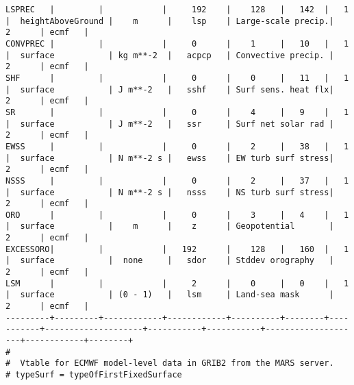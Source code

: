 \documentclass{egu}                  %
\begin{document}
\begin{landscape}
\begin{scriptsize}
\begin{verbatim}
LSPREC   |         |            |     192    |    128   |   142  |   1       |  heightAboveGround |    m      |    lsp    | Large-scale precip.|     2      | ecmf   |
CONVPREC |         |            |     0      |    1     |   10   |   1       |  surface           | kg m**-2  |   acpcp   | Convective precip. |     2      | ecmf   |
SHF      |         |            |     0      |    0     |   11   |   1       |  surface           | J m**-2   |   sshf    | Surf sens. heat flx|     2      | ecmf   |
SR       |         |            |     0      |    4     |   9    |   1       |  surface           | J m**-2   |   ssr     | Surf net solar rad |     2      | ecmf   |
EWSS     |         |            |     0      |    2     |   38   |   1       |  surface           | N m**-2 s |   ewss    | EW turb surf stress|     2      | ecmf   |
NSSS     |         |            |     0      |    2     |   37   |   1       |  surface           | N m**-2 s |   nsss    | NS turb surf stress|     2      | ecmf   |
ORO      |         |            |     0      |    3     |   4    |   1       |  surface           |    m      |    z      | Geopotential       |     2      | ecmf   |
EXCESSORO|         |            |   192      |    128   |   160  |   1       |  surface           |  none     |   sdor    | Stddev orography   |     2      | ecmf   |
LSM      |         |            |     2      |    0     |   0    |   1       |  surface           | (0 - 1)   |   lsm     | Land-sea mask      |     2      | ecmf   |
---------+---------+------------+------------+----------+--------+-----------+--------------------+-----------+-----------+--------------------+------------+--------+
#
#  Vtable for ECMWF model-level data in GRIB2 from the MARS server.
# typeSurf = typeOfFirstFixedSurface

\end{verbatim}\end{scriptsize}

\end{landscape} 
\end{document}
